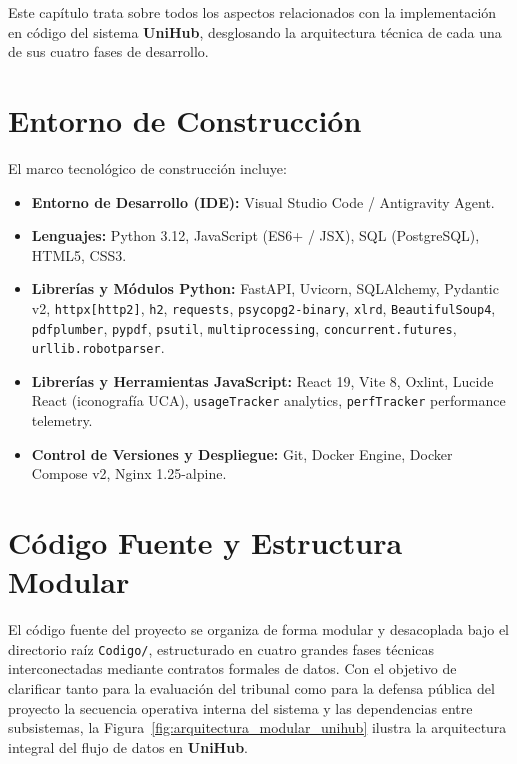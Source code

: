 
Este capítulo trata sobre todos los aspectos relacionados con la implementación en código del sistema \textbf{UniHub}, desglosando la arquitectura técnica de cada una de sus cuatro fases de desarrollo.

\section{Entorno de Construcción}
El marco tecnológico de construcción incluye:
\begin{itemize}
    \item \textbf{Entorno de Desarrollo (IDE):} Visual Studio Code / Antigravity Agent.
    \item \textbf{Lenguajes:} Python 3.12, JavaScript (ES6+ / JSX), SQL (PostgreSQL), HTML5, CSS3.
    \item \textbf{Librerías y Módulos Python:} FastAPI, Uvicorn, SQLAlchemy, Pydantic v2, \texttt{httpx[http2]}, \texttt{h2}, \texttt{requests}, \texttt{psycopg2-binary}, \texttt{xlrd}, \texttt{BeautifulSoup4}, \texttt{pdfplumber}, \texttt{pypdf}, \texttt{psutil}, \texttt{multiprocessing}, \texttt{concurrent.futures}, \texttt{urllib.robotparser}.
    \item \textbf{Librerías y Herramientas JavaScript:} React 19, Vite 8, Oxlint, Lucide React (iconografía UCA), \texttt{usageTracker} analytics, \texttt{perfTracker} performance telemetry.
    \item \textbf{Control de Versiones y Despliegue:} Git, Docker Engine, Docker Compose v2, Nginx 1.25-alpine.
\end{itemize}

\section{Código Fuente y Estructura Modular}
El código fuente del proyecto se organiza de forma modular y desacoplada bajo el directorio raíz \texttt{Codigo/}, estructurado en cuatro grandes fases técnicas interconectadas mediante contratos formales de datos. Con el objetivo de clarificar tanto para la evaluación del tribunal como para la defensa pública del proyecto la secuencia operativa interna del sistema y las dependencias entre subsistemas, la Figura~\ref{fig:arquitectura_modular_unihub} ilustra la arquitectura integral del flujo de datos en \textbf{UniHub}.

